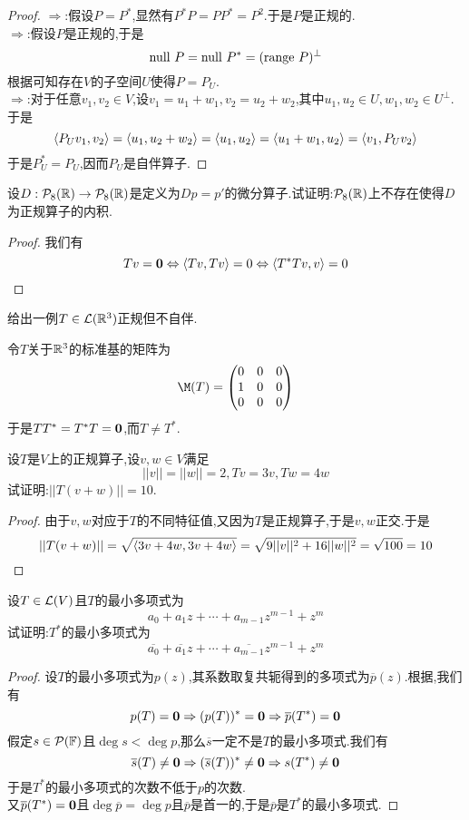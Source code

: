\documentclass{ctexart}
\begin{document}
\begin{proof}
    $\Rightarrow$:假设$P=P^*$,显然有$P^*P=PP^*=P^2$.于是$P$是正规的.\\
    $\Rightarrow$:假设$P$是正规的,于是
    \[\text{null } P=\text{null } P^*=(\text{range } P)^\bot\]
    根据可知存在$V$的子空间$U$使得$P=P_U$.\\
    $\Rightarrow$:对于任意$v_1,v_2\in V$,设$v_1=u_1+w_1,v_2=u_2+w_2$,其中$u_1,u_2\in U,w_1,w_2\in U^\bot$.于是
    \[\left\langle{P_Uv_1},{v_2}\right\rangle=\left\langle{u_1},{u_2+w_2}\right\rangle=\left\langle{u_1},{u_2}\right\rangle=\left\langle{u_1+w_1},{u_2}\right\rangle=\left\langle{v_1},{P_Uv_2}\right\rangle\]
    于是$P_U^*=P_U$,因而$P_U$是自伴算子.
\end{proof}
\begin{problem}[21.]
    设$D:\mathcal{P}_8(\mathbb{R})\to\mathcal{P}_8(\mathbb{R})$是定义为$Dp=p'$的微分算子.试证明:$\mathcal{P}_8(\mathbb{R})$上不存在使得$D$为正规算子的内积.
\end{problem}
\begin{proof}
    我们有
    \[Tv=\mathbf0\Leftrightarrow\left\langle{Tv},{Tv}\right\rangle=0\Leftrightarrow\left\langle{T^*Tv},{v}\right\rangle=0\]
\end{proof}
\begin{problem}[22.]
    给出一例$T\in\mathcal{L}(\mathbb{R}^3)$正规但不自伴.
\end{problem}
\begin{solution}
    令$T$关于$\mathbb{R}^3$的标准基的矩阵为
    \[\M(T)=\begin{pmatrix}
        0&0&0\\1&0&0\\0&0&0
    \end{pmatrix}\]
    于是$TT^*=T^*T=\mathbf0$,而$T\neq T^*$.
\end{solution}
\begin{problem}[23.]
    设$T$是$V$上的正规算子,设$v,w\in V$满足
    \[||v||=||w||=2,Tv=3v,Tw=4w\]
    试证明:$||T(v+w)||=10$.
\end{problem}
\begin{proof}
    由于$v,w$对应于$T$的不同特征值,又因为$T$是正规算子,于是$v,w$正交.于是
    \[||T(v+w)||=\sqrt{\left\langle{3v+4w},{3v+4w}\right\rangle}=\sqrt{9||v||^2+16||w||^2}=\sqrt{100}=10\]
\end{proof}
\begin{problem}[24.]
    设$T\in\mathcal{L}(V)$且$T$的最小多项式为
    \[a_0+a_1z+\cdots+a_{m-1}z^{m-1}+z^m\]
    试证明:$T^*$的最小多项式为
    \[\overline{a_0}+\overline{a_1}z+\cdots+\overline{a_{m-1}}z^{m-1}+z^m\]
\end{problem}
\begin{proof}
    设$T$的最小多项式为$p(z)$,其系数取复共轭得到的多项式为$\overline{p}(z)$.根据,我们有
    \[p(T)=\mathbf0\Rightarrow(p(T))^*=\mathbf0\Rightarrow\overline{p}(T^*)=\mathbf0\]
    假定$s\in\mathcal{P}(\mathbb{F})$且$\deg s<\deg p$,那么$\overline{s}$一定不是$T$的最小多项式.我们有
    \[\overline{s}(T)\neq\mathbf0\Rightarrow(\overline{s}(T))^*\neq\mathbf0\Rightarrow s(T^*)\neq\mathbf0\]
    于是$T^*$的最小多项式的次数不低于$p$的次数.\\
    又$\overline{p}(T^*)=\mathbf0$且$\deg\overline{p}=\deg p$且$\overline{p}$是首一的,于是$\overline{p}$是$T^*$的最小多项式.
\end{proof}
\end{document}
